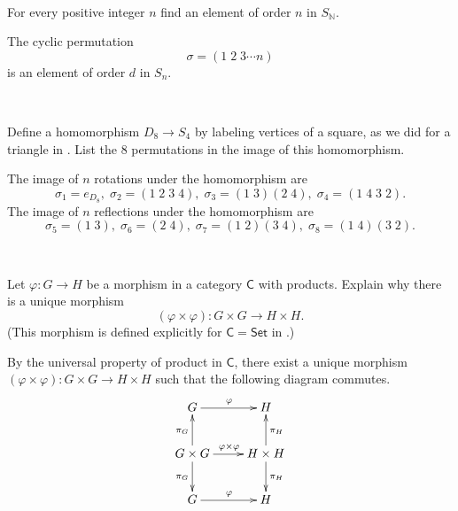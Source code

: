 \documentclass[12pt,letterpaper,boxed]{hmcpset}
\begin{document}
~\\

\begin{problem}[2.3]
	For every positive integer $n$ find an element of order $n$ in $S_\mathbb{N}$.
\end{problem}
\begin{solution}
The cyclic permutation 
\[
\sigma=(1\;2\;3\cdots n)
\]
is an element of order $d$ in $S_n$.
\end{solution}

~\\

\begin{problem}[2.4]	
	Define a homomorphism $D_8 \rightarrow S_4$ by labeling vertices of a square, as we did
	for a triangle in . List the 8 permutations in the image of this homomorphism.
\end{problem}
\begin{solution}
	The image of $n$ rotations under the homomorphism are
	\[
	\sigma_1=e_{D_8},\;\sigma_2=(1\;2\;3\;4),\;\sigma_3=(1\;3)(2\;4),\;\sigma_4=(1\;4\;3\;2).
	\]
	The image of $n$ reflections under the homomorphism are
	\[
	\sigma_5=(1\;3),\;\sigma_6=(2\;4),\;\sigma_7=(1\;2)(3\;4),\;\sigma_8=(1\;4)(3\;2).
	\]
\end{solution}

~\\
\begin{problem}[3.1]	
	Let $\varphi : G\rightarrow H$ be a morphism in a category $\mathsf{C}$ with products. Explain why
	there is a unique morphism
	\[
	(\varphi\times\varphi) : G \times G \longrightarrow H \times H .
	\]
	(This morphism is defined explicitly for $\mathsf{C} = \mathsf{Set}$ in .)
\end{problem}
\begin{solution}
	By the universal property of product in $\mathsf{C}$, there exist a unique morphism $(\varphi\times\varphi) : G \times G \longrightarrow H \times H$ such that the following diagram commutes.
    \[\xymatrix{
    	G\ar[r]^{\varphi} & H \\
    	G \times G\ar[u]^{\pi_G}\ar[d]_{\pi_G}\ar[r]^{\varphi\times\varphi} &  H\times H\ar[u]_{\pi_H}\ar[d]^{\pi_H} \\
    	G\ar[r]^{\varphi} & H 
    }\]
\end{solution}

~\\
\end{document}
